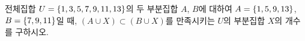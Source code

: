 전체집합 $U=\{1{,}\mkern3mu\mathopen{}3{,}\mkern3mu\mathopen{}5{,}\mkern3mu\mathopen{}7{,}\mkern3mu\mathopen{}9{,}\mkern3mu\mathopen{}11{,}\mkern3mu\mathopen{}13\}$의 두 부분집합 $A$, $B$에 대하여 $A=\{1{,}\mkern3mu\mathopen{}5{,}\mkern3mu\mathopen{}9{,}\mkern3mu\mathopen{}13\}$, $B=\{7{,}\mkern3mu\mathopen{}9{,}\mkern3mu\mathopen{}11\}$일 때, $(A\cup X)\subset(B\cup X)$를 만족시키는 $U$의 부분집합 $X$의 개수를 구하시오.
